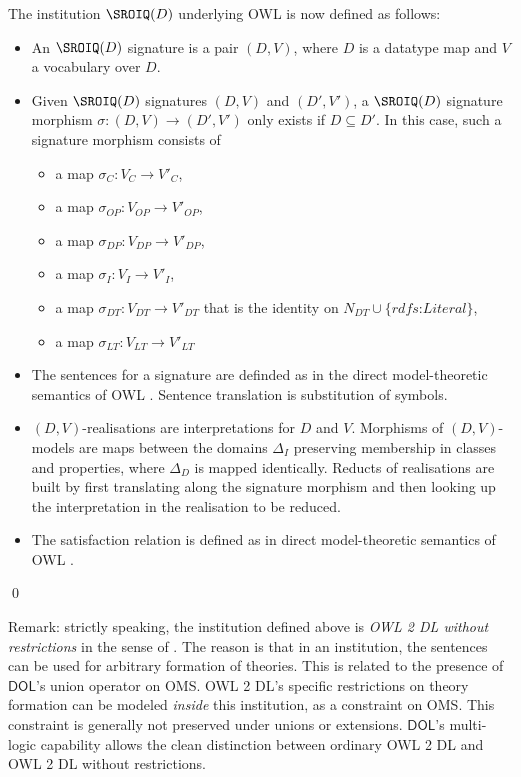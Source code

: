 \documentclass[10pt, a4paper]{isov2}
\newcommand*{\DOL}{\ensuremath{\mathsf{DOL}}\xspace}
\begin{document}
The institution $\SROIQ(D)$ underlying OWL is now defined as follows:
\begin{definition}
\begin{itemize}
\item An $\SROIQ(D)$ signature is a pair $(D,V)$, where $D$ is a
  datatype map and $V$ a vocabulary over $D$.
\item Given $\SROIQ(D)$ signatures $(D,V)$ and $(D',V')$, a
  $\SROIQ(D)$ signature morphism $\sigma\colon (D,V)\to(D',V')$ only
  exists if $D\subseteq D'$. In this case, such a signature morphism
  consists of
\begin{itemize}
\item a map $\sigma_C\colon V_{C}\to V'_{C}$,
\item a map $\sigma_{OP}\colon V_{OP}\to V'_{OP}$,
\item a map $\sigma_{DP}\colon V_{DP}\to V'_{DP}$,
\item a map $\sigma_I\colon V_{I}\to V'_{I}$,
\item a map $\sigma_{DT}\colon V_{DT}\to V'_{DT}$ that is the identity
on $N_{DT} \cup \{ \textit{rdfs:Literal} \}$,
\item a map $\sigma_{LT}\colon V_{LT}\to V'_{LT}$ 

\end{itemize}
\item The sentences for a signature are definded as in
the direct model-theoretic semantics of OWL \cite{w3c:owl2-direct-semantics}. Sentence translation is substitution of symbols.
\item  $(D,V)$-realisations are interpretations for $D$ and $V$. 
Morphisms of $(D,V)$-models are maps between the domains $\Delta_I$ preserving membership in classes and properties, where $\Delta_D$ is mapped identically. Reducts of realisations are built by first translating along the signature morphism and then
looking up the interpretation in the realisation to be reduced.  
\item The satisfaction relation is defined as in direct model-theoretic semantics of OWL \cite{w3c:owl2-direct-semantics}.
\end{itemize}
\qed\end{definition}


Remark: strictly speaking, the institution defined above is
\emph{{OWL} 2 DL without restrictions} in the sense of
\cite{DBLP:conf/owled/SchneiderRS13}. The reason is that in an
institution, the sentences can be used for arbitrary formation of
theories. This is related to the presence of \DOL's union operator on
OMS.  OWL 2 DL's specific restrictions on theory formation can be
modeled \emph{inside} this institution, as a constraint on OMS.  This
constraint is generally not preserved under unions or
extensions. \DOL's multi-logic capability allows the clean distinction
between ordinary OWL 2 DL and {OWL} 2 DL without restrictions.
\end{document}
